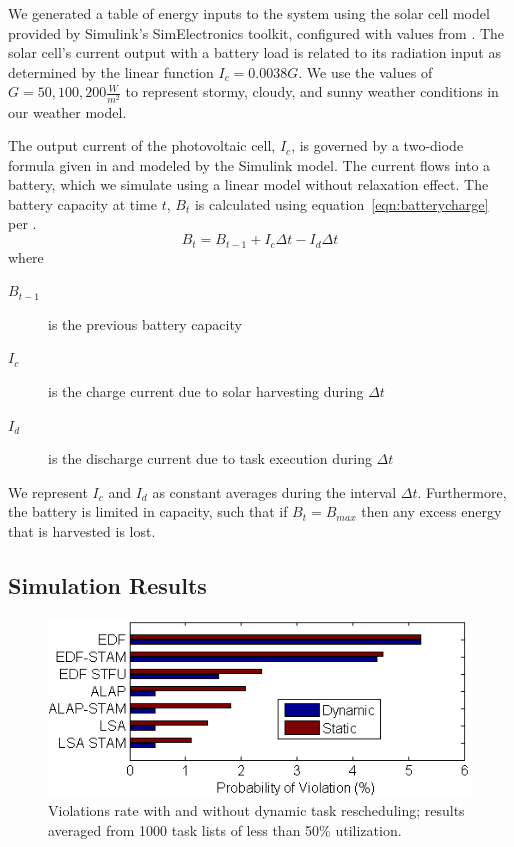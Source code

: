 We generated a table of energy inputs to the system using the solar cell model provided by 
Simulink's SimElectronics toolkit, configured with values from \cite{gonzalez2006model}.  
The solar cell's current output with a battery load is related to its radiation input as 
determined by the linear function $I_c = 0.0038G$.  
We use the values of $G = 50, 100, 200 \frac{W}{m^2}$ to represent stormy, cloudy, and sunny weather conditions 
in our weather model.

The output current of the photovoltaic cell, $I_c$, is governed by a two-diode formula given in \cite{marwali1997probabilistic} and modeled by the Simulink model.  
The current flows into a battery, which we simulate using a linear model without relaxation effect.  
The battery capacity at time $t$, $B_t$ is calculated using equation~\ref{eqn:batterycharge} per \cite{niyato2007sleep}.
\begin{equation}
 B_t = B_{t-1} + I_c \Delta t - I_d \Delta t
\label{eqn:batterycharge}
\end{equation}
where 
\begin{description}
\item[$B_{t-1}$] is the previous battery capacity
\item[$I_c$] is the charge current due to solar harvesting during $\Delta t$
\item[$I_d$] is the discharge current due to task execution during $\Delta t$
\end{description}
We represent $I_c$ and $I_d$  as constant averages during the interval $\Delta t$. Furthermore, the battery is
limited in capacity, such that if $B_t = B_{max}$ then any excess energy that is harvested is lost.

\subsection{Simulation Results}

\begin{figure}[tb]
\begin{center}
\includegraphics[scale=0.65]{bar.png}
\end{center}
\label{fig:simresults}
\caption{Violations rate with and without dynamic task rescheduling; 
results averaged from 1000 task lists of less than 50\% utilization.  }
\end{figure}

